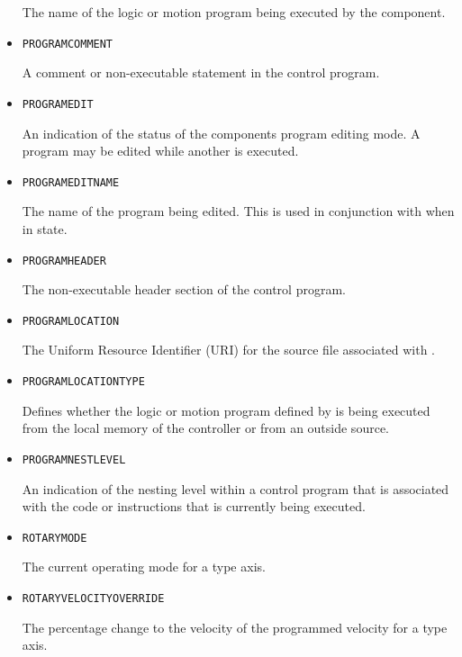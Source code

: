 \begin{itemize}
The name of the logic or motion program being executed by the  component.


\item \texttt{PROGRAM\textunderscore COMMENT}  

A comment or non-executable statement in the control program.


\item \texttt{PROGRAM\textunderscore EDIT}  

An indication of the status of the  components program editing mode. A program may be edited while another is executed.


\item \texttt{PROGRAM\textunderscore EDIT\textunderscore NAME}  

The name of the program being edited. 
 This is used in conjunction with  when in  state. 


\item \texttt{PROGRAM\textunderscore HEADER}  

The non-executable header section of the control program.


\item \texttt{PROGRAM\textunderscore LOCATION}  

The Uniform Resource Identifier (URI) for the source file associated with .


\item \texttt{PROGRAM\textunderscore LOCATION\textunderscore TYPE}  

Defines whether the logic or motion program defined by  is being executed from the local memory of the controller or from an outside source.


\item \texttt{PROGRAM\textunderscore NEST\textunderscore LEVEL}  

An indication of the nesting level within a control program that is associated with the code or instructions that is currently being executed.


\item \texttt{ROTARY\textunderscore MODE}  

The current operating mode for a  type axis.


\item \texttt{ROTARY\textunderscore VELOCITY\textunderscore OVERRIDE}  

The percentage change to the velocity of the programmed velocity for a  type axis.



\end{itemize}
